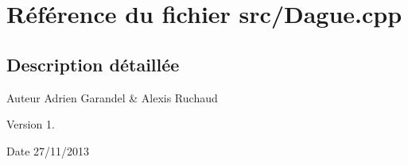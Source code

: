 \section{Référence du fichier src/\-Dague.cpp}
\label{_dague_8cpp}


\subsection{Description détaillée}
\begin{DoxyAuthor}{Auteur}
Adrien Garandel \& Alexis Ruchaud 
\end{DoxyAuthor}
\begin{DoxyVersion}{Version}
1. 
\end{DoxyVersion}
\begin{DoxyDate}{Date}
27/11/2013 
\end{DoxyDate}
